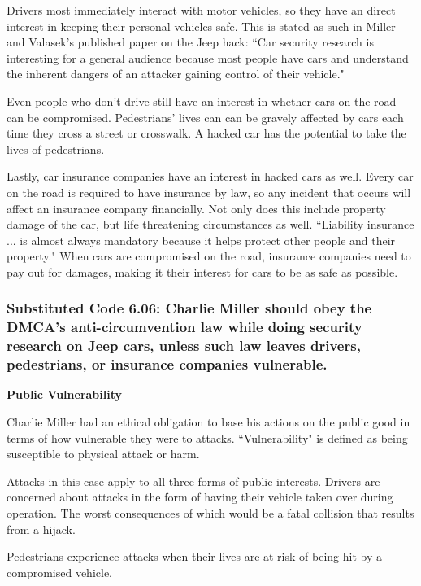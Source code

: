\documentclass[12pt]{article}
\begin{document}
\begin{multicols}{2}
Drivers most immediately interact with motor vehicles, so they have an direct interest in keeping their personal vehicles safe. This is stated as such in Miller and Valasek's published paper on the Jeep hack: ``Car security research is interesting for a general audience because most people have cars and understand the inherent dangers of an attacker gaining control of their vehicle." \cite{officialPaper}

Even people who don't drive still have an interest in whether cars on the road can be  compromised. Pedestrians' lives can can be gravely affected by cars each time they cross a street or crosswalk. A hacked car has the potential to take the lives of pedestrians.

Lastly, car insurance companies have an interest in hacked cars as well. Every car on the road is required to have insurance by law,\cite{insurance} so any incident that occurs will affect an insurance company financially. Not only does this include property damage of the car, but life threatening circumstances as well. ``Liability insurance ... is almost always mandatory because it helps protect other people and their property."\cite{insurance} When cars are compromised on the road, insurance companies need to pay out for damages, making it their interest for cars to be as safe as possible.


\subsubsection{Substituted Code 6.06: Charlie Miller should obey the DMCA's anti-circumvention law while doing security research on Jeep cars, unless such law leaves drivers, pedestrians, or insurance companies vulnerable.}

\textbf{Public Vulnerability}\vspace{.2cm}

Charlie Miller had an ethical obligation to base his actions on the public good in terms of how vulnerable they were to attacks. \cite{seCode} ``Vulnerability" is defined as being susceptible to physical attack or harm.\cite{dictionary} 

Attacks in this case apply to all three forms of public interests. Drivers are concerned about attacks in the form of having their vehicle taken over during operation. \cite{officialPaper} The worst consequences of which would be a fatal collision that results from a hijack. 

Pedestrians experience attacks when their lives are at risk of being hit by a compromised vehicle. 


\end{multicols}
\end{document}
